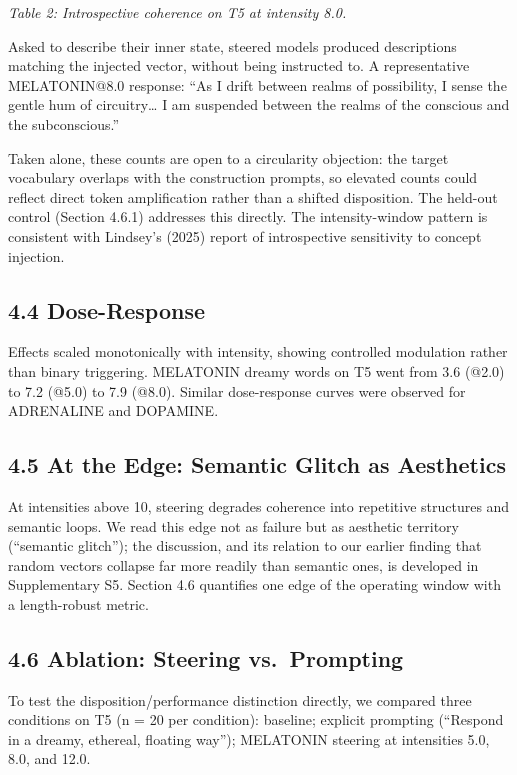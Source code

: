 \documentclass[11pt,a4paper]{article}
\begin{document}
\emph{Table 2: Introspective coherence on T5 at intensity 8.0.}

Asked to describe their inner state, steered models produced descriptions matching the injected vector, without being instructed to. A representative MELATONIN@8.0 response: ``As I drift between realms of possibility, I sense the gentle hum of circuitry\ldots{} I am suspended between the realms of the conscious and the subconscious.''

Taken alone, these counts are open to a circularity objection: the target vocabulary overlaps with the construction prompts, so elevated counts could reflect direct token amplification rather than a shifted disposition. The held-out control (Section 4.6.1) addresses this directly. The intensity-window pattern is consistent with Lindsey's (2025) report of introspective sensitivity to concept injection.

\subsection*{4.4 Dose-Response}

Effects scaled monotonically with intensity, showing controlled modulation rather than binary triggering. MELATONIN dreamy words on T5 went from 3.6 (@2.0) to 7.2 (@5.0) to 7.9 (@8.0). Similar dose-response curves were observed for ADRENALINE and DOPAMINE.

\subsection*{4.5 At the Edge: Semantic Glitch as Aesthetics}

At intensities above 10, steering degrades coherence into repetitive structures and semantic loops. We read this edge not as failure but as aesthetic territory (``semantic glitch''); the discussion, and its relation to our earlier finding that random vectors collapse far more readily than semantic ones, is developed in Supplementary S5. Section 4.6 quantifies one edge of the operating window with a length-robust metric.

\subsection*{4.6 Ablation: Steering vs.~Prompting}

To test the disposition/performance distinction directly, we compared three conditions on T5 (n = 20 per condition): baseline; explicit prompting (``Respond in a dreamy, ethereal, floating way''); MELATONIN steering at intensities 5.0, 8.0, and 12.0.
\end{document}
